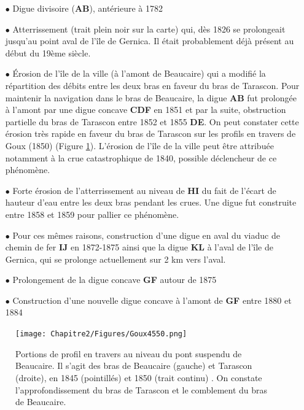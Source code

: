         \begin{itemize}
            \item[$\bullet$] Digue divisoire (\textbf{AB}), antérieure à 1782
            \item[$\bullet$] Atterrissement (trait plein noir sur la carte) qui, dès 1826 se prolongeait jusqu'au point aval de l'île de Gernica. Il était probablement déjà présent au début du 19ème siècle.
            \item[$\bullet$] Érosion de l'île de la ville (à l'amont de Beaucaire) qui a modifié la répartition des débits entre les deux bras en faveur du bras de Tarascon. Pour maintenir la navigation dans le bras de Beaucaire, la digue \textbf{AB} fut prolongée à l'amont par une digue concave \textbf{CDF} en 1851 et par la suite, obstruction partielle du bras de Tarascon entre 1852 et 1855 \textbf{DE}. On peut constater cette érosion très rapide en faveur du bras de Tarascon sur les profils en travers de Goux (1850) (Figure \ref{fig:ProfGoux}). L'érosion de l'île de la ville peut être attribuée notamment à la crue catastrophique de 1840, possible déclencheur de ce phénomène.
            \item[$\bullet$] Forte érosion de l'atterrissement au niveau de \textbf{HI} du fait de l'écart de hauteur d'eau entre les deux bras pendant les crues. Une digue fut construite entre 1858 et 1859 pour pallier ce phénomène.
            \item[$\bullet$] Pour ces mêmes raisons, construction d'une digue en aval du viaduc de chemin de fer \textbf{IJ} en 1872-1875 ainsi que la digue \textbf{KL} à l'aval de l'île de Gernica, qui se prolonge actuellement sur 2 km vers l'aval.
            \item[$\bullet$] Prolongement de la digue concave \textbf{GF} autour de 1875
            \item[$\bullet$] Construction d'une nouvelle digue concave à l'amont de \textbf{GF} entre 1880 et 1884
        \end{itemize}

        \begin{figure}[h]
            \centering
            \texttt{[image: Chapitre2/Figures/Goux4550.png]}
            \caption{Portions de profil en travers au niveau du pont suspendu de Beaucaire. Il s'agit des bras de Beaucaire (gauche) et Tarascon (droite), en 1845 (pointillés) et 1850 (trait continu) \citep{goux_modification_1851}. On constate l'approfondissement du bras de Tarascon et le comblement du bras de Beaucaire.}
            \label{fig:ProfGoux}
        \end{figure}
%            
            
